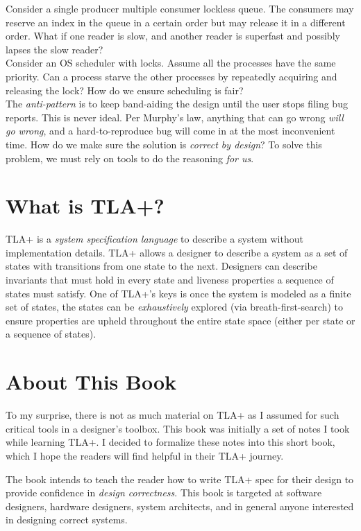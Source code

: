 Consider a single producer multiple consumer lockless queue. The consumers may
reserve an index in the queue in a certain order but may release it in a
different order. What if one reader is slow, and another reader is superfast
and possibly lapses the slow reader?\\

Consider an OS scheduler with locks. Assume all the processes have the same
priority. Can a process starve the other processes by repeatedly acquiring and
releasing the lock? How do we ensure scheduling is fair?\\

The \textit{anti-pattern} is to keep band-aiding the design until the user stops
filing bug reports. This is never ideal. Per Murphy's law, anything that can go
wrong \textit{will go wrong}, and a hard-to-reproduce bug will come in at the
most inconvenient time. How do we make sure the solution is \textit{correct by
design}? To solve this problem, we must rely on tools to do the reasoning
\textit{for us}.

\section{What is TLA+?}

TLA+ is a \textit{system specification language} to describe a system
without implementation details. TLA+ allows a designer to describe a system as a
set of states with transitions from one state to the next. Designers can
describe invariants that must hold in every state and liveness properties a
sequence of states must satisfy. One of TLA+'s keys is once the system is modeled
as a finite set of states, the states can be \textit{exhaustively} explored
(via breath-first-search) to ensure properties are upheld throughout the entire
state space (either per state or a sequence of states).

\section{About This Book}
To my surprise, there is not as much material on TLA+ as I assumed for
such critical tools in a designer's toolbox. This book was initially a set of
notes I took while learning TLA+. I decided to formalize these notes into this
short book, which I hope the readers will find helpful in their TLA+
journey.\newline

The book intends to teach the reader how to write TLA+ spec for their design to
provide confidence in \textit{design correctness}. This book is targeted at
software designers, hardware designers, system architects, and in general anyone
interested in designing correct systems.\newline 

